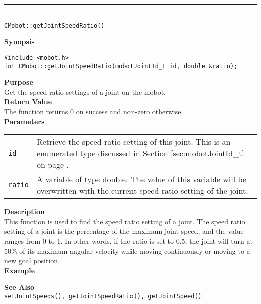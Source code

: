 \noindent
\vspace{5pt}
\rule{4.5in}{0.015in}\\
\noindent
{\LARGE \texttt{CMobot::getJointSpeedRatio()}}\\
{}

\noindent
{\bf Synopsis}
\vspace{-8pt}
\begin{verbatim}
#include <mobot.h>
int CMobot::getJointSpeedRatio(mobotJointId_t id, double &ratio);
\end{verbatim}

\noindent
{\bf Purpose}\\
Get the speed ratio settings of a joint on the mobot.\\

\noindent
{\bf Return Value}\\
The function returns 0 on success and non-zero otherwise.\\

\noindent
{\bf Parameters}
\vspace{-0.1in}
\begin{description}
\item               
\begin{tabular}{p{10 mm}p{145 mm}}
\texttt{id} & Retrieve the speed ratio setting of this joint. This is an 
enumerated type discussed in Section \ref{sec:mobotJointId_t} on page
\pageref{sec:mobotJointId_t}.\\
\texttt{ratio} & A variable of type double. The value of this variable will
be overwritten with the current speed ratio setting of the joint.
\end{tabular}
\end{description}

\noindent
{\bf Description}\\
This function is used to find the speed ratio setting of a joint. The speed
ratio setting of a joint is the percentage of the maximum joint speed, and the
value ranges from 0 to 1. In other words, if the ratio is set to 0.5, the joint 
will turn at 50\% of its maximum angular velocity while moving continuously
or moving to a new goal position.\\

\noindent
{\bf Example}\\
\noindent

\noindent
{\bf See Also}\\
\texttt{setJointSpeeds(), getJointSpeedRatio(), getJointSpeed()}

